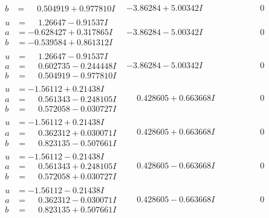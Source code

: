 \documentclass[1p]{elsarticle_modified}
\theoremstyle{definition}
\begin{document}
$$\begin{array}{c|c|c}
\begin{aligned}
b &= \phantom{-}0.504919 + 0.977810 I\end{aligned}
 & -3.86284 + 5.00342 I & \phantom{-0.000000 } 0 \\ \hline\begin{aligned}
u &= \phantom{-}1.26647 - 0.91537 I \\
a &= -0.628427 + 0.317865 I \\
b &= -0.539584 + 0.861312 I\end{aligned}
 & -3.86284 - 5.00342 I & \phantom{-0.000000 } 0 \\ \hline\begin{aligned}
u &= \phantom{-}1.26647 - 0.91537 I \\
a &= \phantom{-}0.602735 - 0.244448 I \\
b &= \phantom{-}0.504919 - 0.977810 I\end{aligned}
 & -3.86284 - 5.00342 I & \phantom{-0.000000 } 0 \\ \hline\begin{aligned}
u &= -1.56112 + 0.21438 I \\
a &= \phantom{-}0.561343 - 0.248105 I \\
b &= \phantom{-}0.572058 - 0.030727 I\end{aligned}
 & \phantom{-}0.428605 + 0.663668 I & \phantom{-0.000000 } 0 \\ \hline\begin{aligned}
u &= -1.56112 + 0.21438 I \\
a &= \phantom{-}0.362312 + 0.030071 I \\
b &= \phantom{-}0.823135 - 0.507661 I\end{aligned}
 & \phantom{-}0.428605 + 0.663668 I & \phantom{-0.000000 } 0 \\ \hline\begin{aligned}
u &= -1.56112 - 0.21438 I \\
a &= \phantom{-}0.561343 + 0.248105 I \\
b &= \phantom{-}0.572058 + 0.030727 I\end{aligned}
 & \phantom{-}0.428605 - 0.663668 I & \phantom{-0.000000 } 0 \\ \hline\begin{aligned}
u &= -1.56112 - 0.21438 I \\
a &= \phantom{-}0.362312 - 0.030071 I \\
b &= \phantom{-}0.823135 + 0.507661 I\end{aligned}
 & \phantom{-}0.428605 - 0.663668 I & \phantom{-0.000000 } 0 \\ \hline\begin{aligned}

\end{aligned}
\end{array}$$
\end{document}
